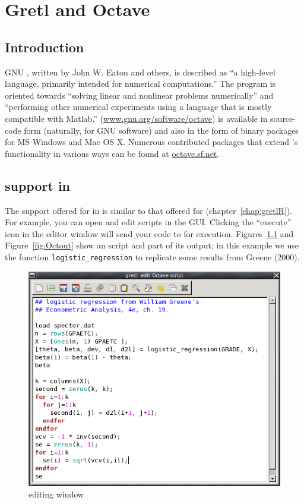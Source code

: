\chapter{Gretl and Octave}
\label{chap:gretlOctave}

\section{Introduction}
\label{Octave-intro}

GNU , written by John W. Eaton and others, is described as
``a high-level language, primarily intended for numerical
computations.''  The program is oriented towards ``solving linear and
nonlinear problems numerically'' and ``performing other numerical
experiments using a language that is mostly compatible with Matlab.''
(\url{www.gnu.org/software/octave})  is available in
source-code form (naturally, for GNU software) and also in the form of
binary packages for MS Windows and Mac OS X.  Numerous contributed
packages that extend 's functionality in various ways can
be found at \url{octave.sf.net}.


\section{ support in }
\label{sec:Octave-support}

The support offered for  in  is similar to that
offered for  (chapter~\ref{chap:gretlR}).  For example, you can
open and edit  scripts in the  GUI.  Clicking
the ``execute'' icon in the editor window will send your code to
 for execution.  Figures~\ref{fig:Octedit} and
Figure~\ref{fig:Octout} show an  script and part of its
output; in this example we use the function \verb|logistic_regression|
to replicate some results from Greene (2000).

\begin{figure}[htbp]
  \centering
  \includegraphics[scale=0.7]{figures/Octedit}
  \caption{ editing window}
  \label{fig:Octedit}
\end{figure}

